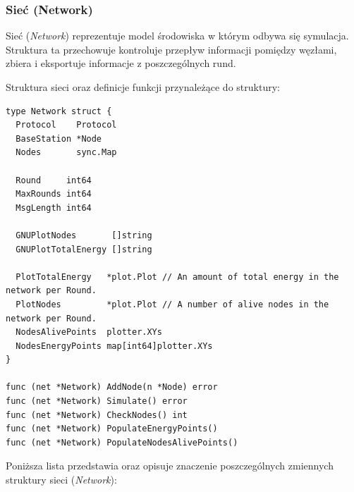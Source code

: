 \documentclass[a4paper,12pt,twoside,openany]{report}
\begin{document}
\subsubsection{Sieć (Network)}

Sieć (\textit{Network}) reprezentuje model środowiska w którym odbywa się symulacja. Struktura ta przechowuje kontroluje przepływ informacji pomiędzy węzłami,
zbiera i eksportuje informacje z poszczególnych rund.

Struktura sieci oraz definicje funkcji przynależące do struktury:

\begin{lstlisting}
type Network struct {
  Protocol    Protocol
  BaseStation *Node
  Nodes       sync.Map

  Round     int64
  MaxRounds int64
  MsgLength int64

  GNUPlotNodes       []string
  GNUPlotTotalEnergy []string

  PlotTotalEnergy   *plot.Plot // An amount of total energy in the network per Round.
  PlotNodes         *plot.Plot // A number of alive nodes in the network per Round.
  NodesAlivePoints  plotter.XYs
  NodesEnergyPoints map[int64]plotter.XYs
}

func (net *Network) AddNode(n *Node) error
func (net *Network) Simulate() error
func (net *Network) CheckNodes() int
func (net *Network) PopulateEnergyPoints()
func (net *Network) PopulateNodesAlivePoints()
\end{lstlisting}

Poniższa lista przedstawia oraz opisuje znaczenie poszczególnych zmiennych struktury sieci (\textit{Network}):
\end{document}
